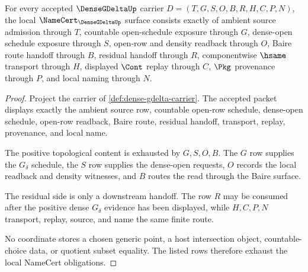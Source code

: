 \begin{theorem}
\label{thm:dense-gdelta-namecert-obligations}
For every accepted $\DenseGDeltaUp$ carrier $D=(T,G,S,O,B,R,H,C,P,N)$, the local $\NameCert_{\DenseGDeltaUp}$ surface consists exactly of ambient source admission through $T$, countable open-schedule exposure through $G$, dense-open schedule exposure through $S$, open-row and density readback through $O$, Baire route handoff through $B$, residual handoff through $R$, componentwise $\hsame$ transport through $H$, displayed $\Cont$ replay through $C$, $\Pkg$ provenance through $P$, and local naming through $N$.
\end{theorem}
\begin{proof}
Project the carrier of \autoref{def:dense-gdelta-carrier}. The accepted packet displays exactly the ambient source row, countable open-row schedule, dense-open schedule, open-row readback, Baire route, residual handoff, transport, replay, provenance, and local name.

The positive topological content is exhausted by $G,S,O,B$. The $G$ row supplies the $G_\delta$ schedule, the $S$ row supplies the dense-open requests, $O$ records the local readback and density witnesses, and $B$ routes the read through the Baire surface.

The residual side is only a downstream handoff. The row $R$ may be consumed after the positive dense $G_\delta$ evidence has been displayed, while $H,C,P,N$ transport, replay, source, and name the same finite route.

No coordinate stores a chosen generic point, a host intersection object, countable-choice data, or quotient subset equality. The listed rows therefore exhaust the local NameCert obligations.
\end{proof}

